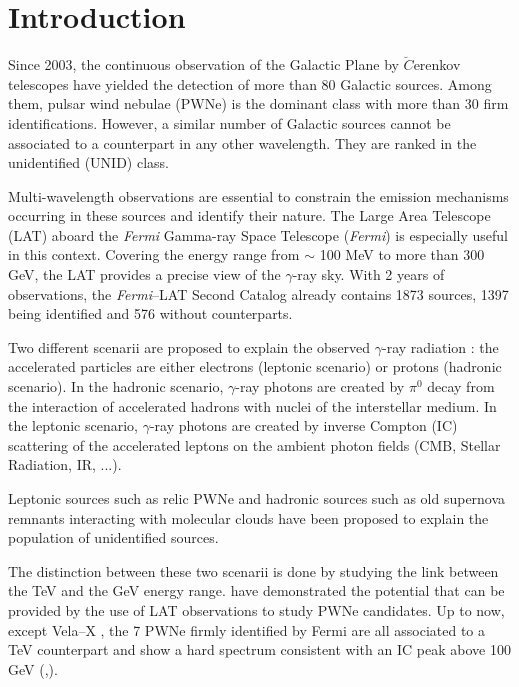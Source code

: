 \section{Introduction}

Since 2003, the continuous observation of the Galactic Plane by $\breve{C}$erenkov telescopes have yielded the detection of more than 80 Galactic sources. Among them, pulsar wind nebulae (PWNe) is the dominant class with more than 30 firm identifications. However, a similar number of Galactic sources cannot be associated to a counterpart in any other wavelength. They are ranked in the unidentified (UNID) class.

Multi-wavelength observations are essential to constrain the emission mechanisms occurring in these sources and identify their nature. The Large Area Telescope (LAT) aboard the \emph{Fermi} Gamma-ray Space Telescope (\emph{Fermi}) is especially useful in this context. Covering the energy range from $\sim$ 100 MeV to more than 300 GeV, the LAT provides a precise view of the $\gamma$-ray sky. With 2 years of observations, the \emph{Fermi}--LAT Second Catalog \citep{2012ApJS..199...31N} already contains 1873 sources, 1397 being identified and 576 without counterparts.

Two different scenarii are proposed to explain the observed $\gamma$-ray radiation : the accelerated particles are either electrons (leptonic scenario) or protons (hadronic scenario). In the hadronic scenario, $\gamma$-ray photons are created by $\pi^0$ decay from the interaction of accelerated hadrons with nuclei of the interstellar medium. In the leptonic scenario, $\gamma$-ray photons are created by inverse Compton (IC) scattering of the accelerated leptons on the ambient photon fields (CMB, Stellar Radiation, IR, ...).

Leptonic sources such as relic PWNe \citep{2009ASSL..357..451D,2009arXiv0906.2644D} and hadronic sources such as old supernova remnants interacting with molecular clouds \citep{2011arXiv1104.1197U} have been proposed to explain the population of unidentified sources.

The distinction between these two scenarii is done by studying the link between the TeV and the GeV energy range. \cite{2010ApJ...720..266S,2011ApJ...738...42G,Rousseau1857} have demonstrated the potential that can be provided by the use of LAT observations to study PWNe candidates. Up to now, except Vela--X \citep{2010ApJ...713..146A}, the 7 PWNe firmly identified by Fermi are all associated to a TeV counterpart and show a hard spectrum consistent with an IC peak above 100 GeV (\cite{2010ApJ...708.1254A},\cite{2011ApJ...738...42G}).


